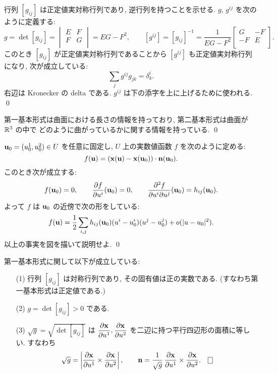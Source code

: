 \documentclass[12pt,twoside]{jarticle}
\begin{document}
\begin{definition}
  行列 $[g_{ij}]$ は正定値実対称行列であり, 逆行列を持つことを示せる.
  $g$, $g^{ij}$ を次のように定義する:
  \begin{equation*}
   g = \det[g_{ij}] =
   \begin{vmatrix}
    E & F \\
    F & G \\
   \end{vmatrix}
   = EG -F^2,
   \qquad
   [g^{ij}] = [g_{ij}]^{-1} =
   \dfrac{1}{EG-F^2}
   \begin{bmatrix}
     G & -F \\
    -F &  E \\
   \end{bmatrix}.
  \end{equation*}
  このとき $[g_{ij}]$ が正定値実対称行列であることから %
  $[g^{ij}]$ も正定値実対称行列になり, 次が成立している:
 \begin{equation*}
  \sum_{j}g^{ij}g_{jk} = \delta^i_k. 
 \end{equation*}
 右辺は Kronecker の delta である. 
 $g^{ij}$ は下の添字を上に上げるために使われる. 
 \qed
\end{definition}

\begin{rem}
 第一基本形式は曲面における長さの情報を持っており, 
 第二基本形式は曲面が ${\mathbb R}^3$ の中で
 どのように曲がっているかに関する情報を持っている.
 \qed
\end{rem}

\begin{question}[第二基本形式の幾何学的意味]
  ${\mathbf u}_0=(u_0^1,u_0^2)\in U$ を任意に固定し, 
  $U$ 上の実数値函数 $f$ を次のように定める: %
  \[
    f({\mathbf u}) = ({\mathbf x}({\mathbf u}) - {\mathbf x}({\mathbf u}_0)) \cdot {\mathbf n}({\mathbf u}_0).
  \]
  このとき次が成立する:
  \[
    f({\mathbf u}_0) = 0,
    \qquad
    \dfrac{\partial f}{\partial u^i}({\mathbf u}_0) = 0,
    \qquad
    \dfrac{\partial^2 f}{\partial u^i\partial u^j}({\mathbf u}_0) = h_{ij}({\mathbf u}_0).
  \]
  よって $f$ は ${\mathbf u}_0$ の近傍で次の形をしている:
  \[
    f({\mathbf u})
    =
    \frac{1}{2}
    \sum_{i,j} h_{ij}({\mathbf u}_0) (u^i - u^i_0)(u^j - u^j_0)
    + o(|u - u_0|^2). 
  \]
 以上の事実を図を描いて説明せよ. \qed
\end{question}

\begin{question}[第一基本形式に関する補足]
 第一基本形式に関して以下が成立している:
 \begin{enumerate}
  \item[(1)] 行列 $[g_{ij}]$ は対称行列であり, その固有値は正の実数である.
   (すなわち第一基本形式は正定値である.)
  \item[(2)] $g=\det[g_{ij}]>0$ である. 
  \item[(3)] $\sqrt{g}=\sqrt{\det[g_{ij}]}$ 
   は $\dfrac{\partial{\mathbf x}}{\partial u^1}, \dfrac{\partial{\mathbf x}}{\partial u^2}$ 
   を二辺に持つ平行四辺形の面積に等しい. すなわち
   \begin{equation*}
    \sqrt{g} = \left|\dfrac{\d\x}{\d u^1} \times \dfrac{\d\x}{\d u^2}\right|,
     \qquad
    \n = \dfrac{1}{\sqrt{g}}\,\dfrac{\d\x}{\d u^1} \times \dfrac{\d\x}{\d u^2}.
    \qed
   \end{equation*}
 \end{enumerate}
\end{question}
\end{document}
